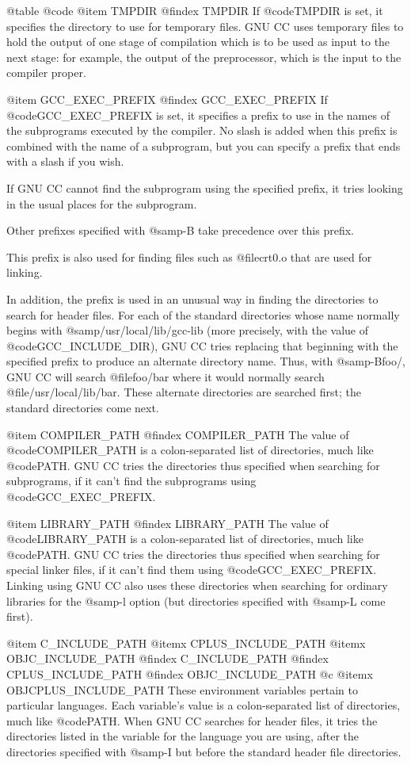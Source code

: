 {{@table @code
@item TMPDIR
@findex TMPDIR
If @code{TMPDIR} is set, it specifies the directory to use for temporary
files.  GNU CC uses temporary files to hold the output of one stage of
compilation which is to be used as input to the next stage: for example,
the output of the preprocessor, which is the input to the compiler
proper.

@item GCC_EXEC_PREFIX
@findex GCC_EXEC_PREFIX
If @code{GCC_EXEC_PREFIX} is set, it specifies a prefix to use in the
names of the subprograms executed by the compiler.  No slash is added
when this prefix is combined with the name of a subprogram, but you can
specify a prefix that ends with a slash if you wish.

If GNU CC cannot find the subprogram using the specified prefix, it
tries looking in the usual places for the subprogram.

Other prefixes specified with @samp{-B} take precedence over this prefix.

This prefix is also used for finding files such as @file{crt0.o} that are
used for linking.

In addition, the prefix is used in an unusual way in finding the
directories to search for header files.  For each of the standard
directories whose name normally begins with @samp{/usr/local/lib/gcc-lib}
(more precisely, with the value of @code{GCC_INCLUDE_DIR}), GNU CC tries
replacing that beginning with the specified prefix to produce an
alternate directory name.  Thus, with @samp{-Bfoo/}, GNU CC will search
@file{foo/bar} where it would normally search @file{/usr/local/lib/bar}.
These alternate directories are searched first; the standard directories
come next.

@item COMPILER_PATH
@findex COMPILER_PATH
The value of @code{COMPILER_PATH} is a colon-separated list of
directories, much like @code{PATH}.  GNU CC tries the directories thus
specified when searching for subprograms, if it can't find the
subprograms using @code{GCC_EXEC_PREFIX}.

@item LIBRARY_PATH
@findex LIBRARY_PATH
The value of @code{LIBRARY_PATH} is a colon-separated list of
directories, much like @code{PATH}.  GNU CC tries the directories thus
specified when searching for special linker files, if it can't find them
using @code{GCC_EXEC_PREFIX}.  Linking using GNU CC also uses these
directories when searching for ordinary libraries for the @samp{-l}
option (but directories specified with @samp{-L} come first).

@item C_INCLUDE_PATH
@itemx CPLUS_INCLUDE_PATH
@itemx OBJC_INCLUDE_PATH
@findex C_INCLUDE_PATH
@findex CPLUS_INCLUDE_PATH
@findex OBJC_INCLUDE_PATH
@c @itemx OBJCPLUS_INCLUDE_PATH
These environment variables pertain to particular languages.  Each
variable's value is a colon-separated list of directories, much like
@code{PATH}.  When GNU CC searches for header files, it tries the
directories listed in the variable for the language you are using, after
the directories specified with @samp{-I} but before the standard header
file directories.

}}
